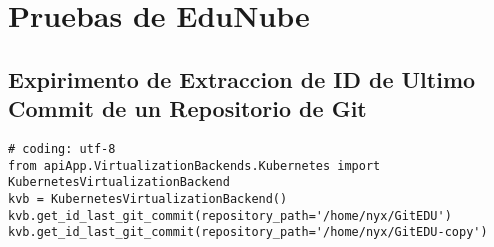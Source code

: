 \lstset{language=Bash}

\chapter{Pruebas de EduNube}
\label{AnexoG}

\section{Expirimento de Extraccion de ID de Ultimo Commit de un Repositorio de Git}
\lstset{language=Python}
\begin{lstlisting}[breaklines]
# coding: utf-8
from apiApp.VirtualizationBackends.Kubernetes import KubernetesVirtualizationBackend
kvb = KubernetesVirtualizationBackend()
kvb.get_id_last_git_commit(repository_path='/home/nyx/GitEDU')
kvb.get_id_last_git_commit(repository_path='/home/nyx/GitEDU-copy')
\end{lstlisting}

